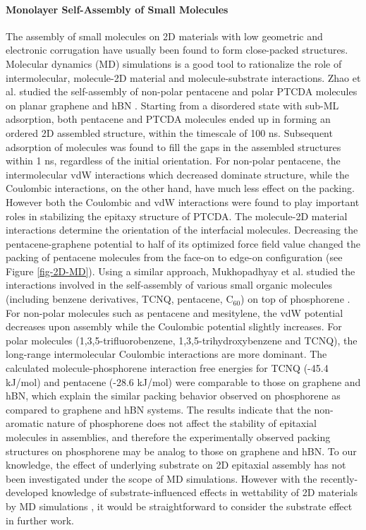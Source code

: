 \paragraph{Monolayer Self-Assembly of Small Molecules}
\label{sec:orgfd77377}

The assembly of small molecules on 2D materials with low geometric and
electronic corrugation have usually been found to form close-packed
structures. Molecular dynamics (MD) simulations is a good tool to
rationalize the role of intermolecular, molecule-2D material and
molecule-substrate interactions. Zhao et al. studied the self-assembly
of non-polar pentacene and polar PTCDA molecules on planar graphene
and hBN \cite{Zhao_2015_self_assemb_gr_MD}. Starting from a disordered
state with sub-ML adsorption, both pentacene and PTCDA molecules ended
up in forming an ordered 2D assembled structure, within the timescale
of 100 ns. Subsequent adsorption of molecules was found to fill the
gaps in the assembled structures within 1 ns, regardless of the
initial orientation. For non-polar pentacene, the intermolecular vdW
interactions which decreased dominate structure, while the Coulombic
interactions, on the other hand, have much less effect on the
packing. However both the Coulombic and vdW interactions were found to
play important roles in stabilizing the epitaxy structure of
PTCDA. The molecule-2D material interactions determine the orientation
of the interfacial molecules. Decreasing the pentacene-graphene
potential to half of its optimized force field value changed the
packing of pentacene molecules from the face-on to edge-on
configuration (see Figure \ref{fig-2D-MD}). Using a similar approach,
Mukhopadhyay et al. studied the interactions involved in the
self-assembly of various small organic molecules (including benzene
derivatives, TCNQ, pentacene, C\(_{\text{60}}\)) on top of phosphorene
\cite{Mukhopadhyay_2017_cryst_BP}. For non-polar molecules such as
pentacene and mesitylene, the vdW potential decreases upon assembly
while the Coulombic potential slightly increases. For polar molecules
(1,3,5-trifluorobenzene, 1,3,5-trihydroxybenzene and TCNQ), the
long-range intermolecular Coulombic interactions are more
dominant. The calculated molecule-phosphorene interaction free
energies for TCNQ (-45.4 kJ/mol) and pentacene (-28.6 kJ/mol) were
comparable to those on graphene and hBN, which explain the similar
packing behavior observed on phosphorene as compared to graphene and
hBN systems. The results indicate that the non-aromatic nature of
phosphorene does not affect the stability of epitaxial molecules in
assemblies, and therefore the experimentally observed packing
structures on phosphorene may be analog to those on graphene and
hBN. To our knowledge, the effect of underlying substrate on 2D
epitaxial assembly has not been investigated under the scope of MD
simulations. However with the recently-developed knowledge of
substrate-influenced effects in wettability of 2D materials by MD
simulations \cite{shih_breakdown_2012,Hung_2015_MD_water_sub}, it would
be straightforward to consider the substrate effect in further work.

